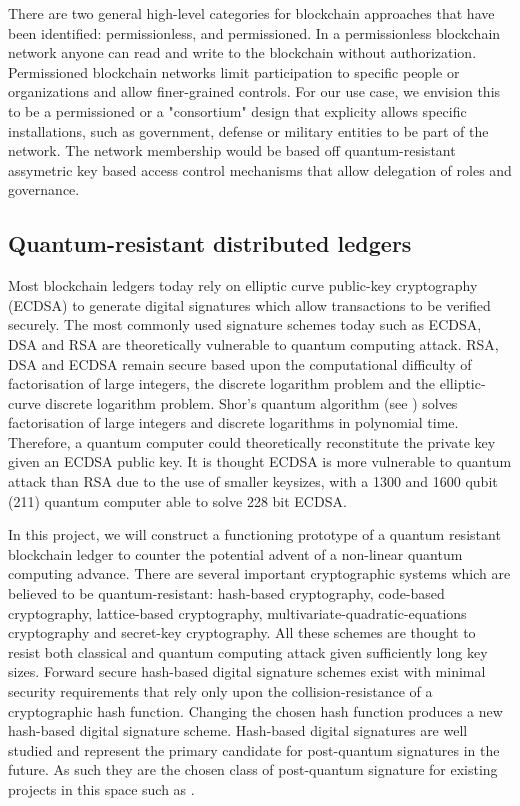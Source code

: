 There are two general high-level categories for blockchain approaches that have been identified: permissionless, and
permissioned. In a permissionless blockchain network anyone can read and write to the blockchain without authorization.
Permissioned blockchain networks limit participation to specific people or organizations and allow finer-grained
controls.  For our use case, we envision this to be a permissioned or a "consortium" design that explicity allows
specific installations, such as government, defense or military entities to be part of the network.  The network
membership would be based off quantum-resistant assymetric key based access control mechanisms that allow
delegation of roles and governance.

\subsection{Quantum-resistant distributed ledgers}

Most blockchain ledgers today rely on elliptic curve public-key cryptography (ECDSA) to generate digital signatures
which allow transactions to be verified securely. The most commonly used signature schemes today such as ECDSA, DSA and
RSA are theoretically vulnerable to quantum computing attack. RSA, DSA and ECDSA remain secure based upon the
computational difficulty of factorisation of large integers, the discrete logarithm problem and the elliptic-curve
discrete logarithm problem. Shor’s quantum algorithm (see \cite{shor1997}) solves factorisation of large integers and discrete
logarithms in polynomial time. Therefore, a quantum computer could theoretically reconstitute the private key given an
ECDSA public key. It is thought ECDSA is more vulnerable to quantum attack than RSA due to the use of smaller keysizes,
with a 1300 and 1600 qubit (211) quantum computer able to solve 228 bit ECDSA.

In this project, we will construct a functioning prototype of a quantum resistant blockchain ledger to counter the
potential advent of a non-linear quantum computing advance.  There are several important cryptographic systems which are
believed to be quantum-resistant: hash-based cryptography, code-based cryptography, lattice-based cryptography,
multivariate-quadratic-equations cryptography and secret-key cryptography. All these schemes are thought to resist both
classical and quantum computing attack given sufficiently long key sizes.  Forward secure hash-based digital signature
schemes exist with minimal security requirements that rely only upon the collision-resistance of a cryptographic hash
function. Changing the chosen hash function produces a new hash-based digital signature scheme. Hash-based digital
signatures are well studied and represent the primary candidate for post-quantum signatures in the future. As such they
are the chosen class of post-quantum signature for existing projects in this space such as \cite{qrl2016}.


